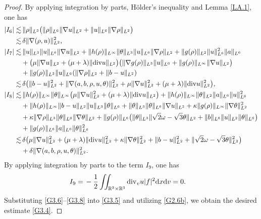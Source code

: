 \documentclass[reqno,11pt]{amsart}
\theoremstyle{plain}
\numberwithin{equation}{section}
\begin{document}
\begin{proof}
By applying  integration by parts, H\"{o}lder’s inequality and Lemma \ref{LA.1}, one has
\begin{align}
|I_6|\lesssim&\, \|\rho \|_{L^3}\big(\|\rho\|_{L^6}\|\nabla u\|_{L^2}+ \|u\|_{L^6}\|\nabla\rho\|_{L^2} \big)\nonumber\\
\lesssim&\, \delta  \|\nabla(\rho,u)\|_{L^2}^2,  \label{G3.8-1}\\
|I_7|\lesssim&\, \|u\|_{L^3}\|u\|_{L^6}\|\nabla u\|_{L^2}+\|h(\rho)\|_{L^\infty}\|\theta\|_{L^3}\|u\|_{L^6}\|\nabla\rho\|_{L^2}+ \|g(\rho)\|_{L^2}\|u\|_{L^6}^2 \|a\|_{L^6}  \nonumber\\
&+\big( \mu\|\nabla u\|_{L^2}+ (\mu+\lambda) \|{\rm div} u\|_{L^2} \big)\big( \|\nabla g(\rho)\|_{L^3}\|u\|_{L^6}  +\|g(\rho)\|_{L^\infty}\|\nabla u\|_{L^2}    \big) \nonumber\\
&+\|g(\rho)\|_{L^3} \|u\|_{L^6}(\|\nabla\rho\|_{L^2}+\|b-u\|_{L^2} )\nonumber\\
\lesssim&\, \delta \big( \|b-u\|_{L^2}^2+\|\nabla(a,b,\rho,u,\theta)\|_{L^2}^2+\mu\|\nabla u\|_{L^2}^2+(\mu+\lambda)\|{\rm div} u\|_{L^2}^2       \big),\label{G3.8-2}\\
|I_8|\lesssim&\, \|h(\rho)\|_{L^\infty} \|\theta\|_{L^\infty}     \big(\mu\|\nabla u\|_{L^2}^2+(\mu+\lambda)\|{\rm div} u\|_{L^2}  \big)+\|h(\rho)\|_{L^\infty} \|\theta\|_{L^2}\|a\|_{L^6}\|u\|_{L^6}^2 \nonumber\\
&+\|h(\rho)\|_{L^\infty} \|b-u\|_{L^2}\|u\|_{L^3}\|\theta\|_{L^6}+\|\theta\|_{L^3}\|\theta\|_{L^6}\|\nabla u\|_{L^2}+\kappa \|g(\rho)\|_{L^\infty}\|\nabla\theta\|_{L^2}^2  \nonumber\\
&+\kappa \|\nabla\rho\|_{L^3}\|\theta\|_{L^6}\|\nabla\theta\|_{L^2}+\|g(\rho)\|_{L^6} \big( \|\theta\|_{L^3}\|\sqrt{2}\omega-\sqrt{3}\theta\|_{L^2} +\|b\|_{L^6}\|u\|_{L^2}\|\theta\|_{L^6}       \big)\nonumber\\
&+\|g(\rho)\|_{L^6}\|a\|_{L^6}\|\theta\|_{L^6}^2\nonumber\\
\lesssim&\, \delta \big(  \mu \|\nabla u\|_{L^2}^2+(\mu+\lambda)\|{\rm div} u\|_{L^2}^2+\kappa\|\nabla\theta\|_{L^2}^2+\|b-u\|_{L^2}^{2}
+\|\sqrt{2}\omega-\sqrt{3}\theta\|_{L^2}^2 \big) \nonumber\\
&+\delta  \|\nabla(a,b,\rho,u, \theta)\|_{L^2}^2.\label{G3.8-3}
\end{align} 
By applying  integration by parts to the term $I_9$, one has
\begin{align} 
I_9=&\, -\frac{1}{2}\iint_{\mathbb{R}^3\times\mathbb{R}^3} {\rm div}_v u |f|^2{\rm d}x{\rm d}v=0.\label{G3.8}
\end{align}
Substituting \eqref{G3.6}--\eqref{G3.8} into \eqref{G3.5} and utilizing \eqref{G2.6b}, we  obtain the desired  estimate \eqref{G3.4}.
\end{proof}
\end{document}

